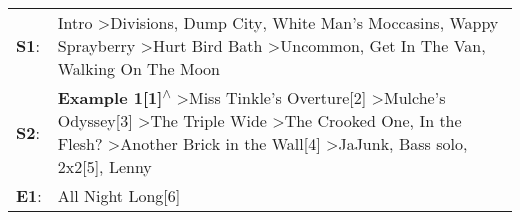\begin{supertabular}{p{0.03\textwidth}p{0.92\textwidth}}
 \textbf{S1}:  &                                                                                                                                                       Intro\textsuperscript{} \textgreater \enspace Divisions\textsuperscript{}, \enspace Dump City\textsuperscript{}, \enspace White Man's Moccasins\textsuperscript{}, \enspace Wappy Sprayberry\textsuperscript{} \textgreater \enspace Hurt Bird Bath\textsuperscript{} \textgreater \enspace Uncommon\textsuperscript{}, \enspace Get In The Van\textsuperscript{}, \enspace Walking On The Moon\textsuperscript{}  \enspace  \\
 \textbf{S2}:  &  \textbf{Example 1[1]\textsuperscript{$\wedge$}} \textgreater \enspace Miss Tinkle's Overture[2]\textsuperscript{} \textgreater \enspace Mulche's Odyssey[3]\textsuperscript{} \textgreater \enspace The Triple Wide\textsuperscript{} \textgreater \enspace The Crooked One\textsuperscript{}, \enspace In the Flesh?\textsuperscript{} \textgreater \enspace Another Brick in the Wall[4]\textsuperscript{} \textgreater \enspace JaJunk\textsuperscript{}, \enspace Bass solo\textsuperscript{}, \enspace 2x2[5]\textsuperscript{}, \enspace Lenny\textsuperscript{}  \enspace  \\
 \textbf{E1}:  &                                                                                                                                                                                                                                                                                                                                                                                                                                                                                                                                     All Night Long[6]\textsuperscript{}  \enspace  \\
\end{supertabular}
